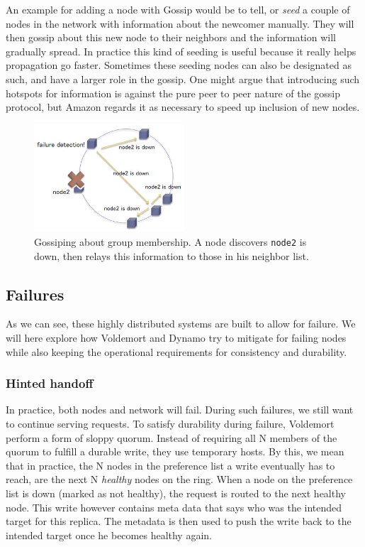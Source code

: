 \begin{itemize}
An example for adding a node with Gossip would be to tell, or \emph{seed} a couple of nodes in the network with information about the newcomer manually. They will then gossip about this new node to their neighbors and the information will gradually spread. In practice this kind of seeding is useful because it really helps propagation go faster. Sometimes these seeding nodes can also be designated as such, and have a larger role in the gossip. One might argue that introducing such hotspots for information is against the pure peer to peer nature of the gossip protocol, but Amazon regards it as necessary to speed up inclusion of new nodes.

\begin{figure}[h]
    \centering
    \includegraphics[width=0.5\textwidth]{background/figures/gossip}
    \caption{Gossiping about group membership. A node discovers \texttt{node2} is down, then relays this information to those in his neighbor list.}
    \label{fig:gossip}
\end{figure}


\end{itemize}

\subsection{Failures}
\label{sec:failures}
As we can see, these highly distributed systems are built to allow for failure. We will here explore how Voldemort and Dynamo try to mitigate for failing nodes while also keeping the operational requirements for consistency and durability. 

\subsubsection{Hinted handoff}
In practice, both nodes and network will fail. During such failures, we still want to continue serving requests.
To satisfy durability during failure, Voldemort perform a form of sloppy quorum. 
Instead of requiring all N members of the quorum to fulfill a durable write, they use temporary hosts. 
By this, we mean that in practice, the N nodes in the preference list a write eventually has to reach, are the next N \emph{healthy} nodes on the ring.
When a node on the preference list is down (marked as not healthy), the request is routed to the next healthy node. 
This write however contains meta data that says who was the intended target for this replica. 
The metadata is then used to push the write back to the intended target once he becomes healthy again.

